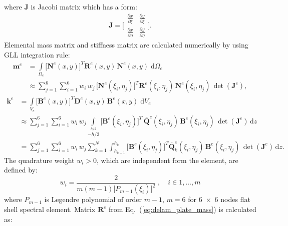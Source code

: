 \documentclass[preprint,12pt]{elsarticle}
\newcommand{\ud}{\mathrm{d}}
\renewcommand{\vec}[1]{\mathbf{#1}}
\renewcommand{\bm}[1]{\mathbf{#1}}
\begin{document}
	where $\vec{J}$ is Jacobi matrix which has a form:
	\begin{equation}
	\vec{J} = \Bigg[ \begin{array}{cc}\frac{\partial x}{\partial \xi}&\frac{\partial y}{\partial \xi}\\[4pt]
	\frac{\partial x}{\partial \eta}&\frac{\partial y}{\partial \eta}\end{array} \Bigg].
	\label{eq:Jacobi2D}
	\end{equation}
	Elemental mass matrix and stiffness matrix are calculated numerically by using GLL integration rule:
	\begin{equation}
	\begin{split}
	\bm{m}^e &= \int \limits_{\Omega_e} \big[\bm{N}^e\!(x,y)\big]^{\!T} \bm{R}^e\!(x,y) \, \bm{N}^e\!(x,y) \; \ud \Omega_e \\
	&	\approx \sum \limits_{j=1}^{6} \sum \limits_{i=1}^{6} w_i\, w_j \, \big[\bm{N}^e\!(\xi_i, \eta_j)\big]^{\!T} \bm{R}^e\!(\xi_i, \eta_j)	\,
	\bm{N}^e\!(\xi_i,\eta_j) \, \det(\vec{J}^e), \label{eq:delam_plate_mass}
	\end{split}
	\end{equation} 
	\begin{equation}
	\begin{split}
	\bm{k}^e &= \int \limits_{V_e} \big[\vec{B}^e\!(x,y)\big]^{\!T} \vec{D}^e \!(x,y)\, \vec{B}^e\!(x,y) \; \ud V_e \\
	& \approx \sum \limits_{j=1}^{6} \sum \limits_{i=1}^{6} w_i\, w_j\! \int \limits_{-h/2}\limits^{h/2} \big[\vec{B}^e\!(\xi_i,\eta_j)\big]^{\!T}\, \bm{\overline Q}^e\!(\xi_i,\eta_j) \, \vec{B}^e\!(\xi_i,\eta_j) \, \det(\vec{J}^e)\, \ud z\\
	&=\sum \limits_{j=1}^{6} \sum \limits_{i=1}^{6} w_i\, w_j \sum \limits_{k=1}^{N} \int_{h_{k-1}}^{h_k} \big[\vec{B}^e\!(\xi_i,\eta_j)\big]^{\!T} \bm{\overline Q}_k^e\!(\xi_i,\eta_j) \, \vec{B}^e\!(\xi_i,\eta_j) \, \det(\vec{J}^e)\, \ud z. \label{eq:dealm_plate_stiffness}
	\end{split}
	\end{equation} 
	The quadrature weight $w_i > 0$, which are independent form the element, are defined by:
	\begin{equation}
	w_i = \frac{2}{m(m-1)\big[ P_{m-1}\!(\xi_i) \big]^2}\; , \quad i \in 1,\ldots, m \label{eq:weights}
	\end{equation}
	where $P_{m-1}$ is Legendre polynomial of order $m-1$, $m=6$ for 6~$\times$~6 nodes flat shell spectral element.
	Matrix $\bm{R}^e$ from Eq.~(\ref{eq:delam_plate_mass}) is calculated as:
\end{document}
